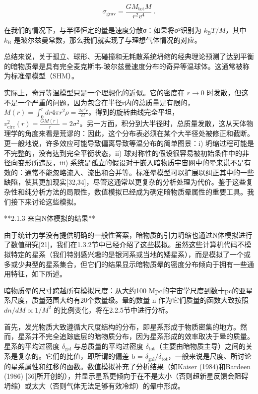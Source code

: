 \[ \sigma_{\text{grav}} = \frac{G M_{\text{tot}} M}{r^2 v^4}~. \]

在我们的情况下，与半径恒定的量是速度分散σ：如果将σ²识别为 \( k_{\text{B}} T/M \)，其中 \( k_{\text{B}} \) 是玻尔兹曼常数，那么我们就实现了与理想气体情况的对应。

总结来说，关于孤立、球形、无碰撞和无耗散系统坍缩的经典理论预测了达到平衡的暗物质晕是具有完全麦克斯韦-玻尔兹曼速度分布的奇异等温球体。这通常被称为标准晕模型（SHM）。

实际上，奇异等温模型只是一个理想化的近似。它的密度在 \( r \to 0 \) 时发散，但这不是一个严重的问题，因为包含在半径r内的总质量是有限的，\( M(r) = \int_0^r dr 4\pi r^2 \rho = \frac{2\sigma^2 r}{G} \)。得到的旋转曲线完全平坦，\( v_{\text{circ}}^2(r) = \frac{G M(r)}{r} = 2\sigma^2 \)。另一方面，积分到大半径时，总质量发散，这从天体物理学的角度来看是荒谬的：因此，这个分布表必须在某个大半径处被修正和截断。更一般地说，许多效应可能导致偏离导致等温分布的简单图景：i) 坍缩过程可能是不完整的，没有达到完全平衡状态，ii) 球对称性的假设很容易被初始条件中的非径向变形所违反，iii) 系统是孤立的假设对于嵌入暗物质宇宙网中的晕来说不是有效的：通常不能忽略流入、流出和合并等。标准晕模型可以扩展以纠正其中的一些缺陷，使其更加现实[32,34]，尽管这通常以更复杂的分析处理为代价。鉴于这些复杂性和纯分析方法的局限性，数值模拟已经成为确定暗物质晕属性的重要工具。我们接下来讨论这些模拟。

**2.1.3 来自N体模拟的结果**

由于统计力学没有提供明确的一般性答案，暗物质的引力坍缩也通过N体模拟进行了数值研究[21]，我们在1.3.2节中已经介绍了这些模拟。虽然这些计算机代码不模拟特定的星系（我们特别感兴趣的是银河系或当地的矮星系），而是模拟了一个或多或少典型的星系集合，但它们的结果显示暗物质晕的密度分布倾向于拥有一些通用特征，如下所述。

暗物质晕的尺寸跨越所有模拟尺度：从大约100 Mpc的宇宙学尺度到数十pc的亚星系尺度，质量范围大约有20个数量级。晕的数量 n 作为它们质量的函数大致按照 \( dn/dM \propto 1/M^2 \) 的比例变化，将在2.2.5节中进行分析。

首先，发光物质大致遵循大尺度结构的分布，即星系形成于物质密集的地方。然而，星系并不完全追踪底层的暗物质分布，因为星系形成的效率取决于晕的质量。星系的平均过密度 \( \delta_{\text{gal}} \) 与总质量的平均过密度 \( \delta_{\text{tot}} \)（主要由暗物质主导）之间的关系是复杂的。它们的比值，即所谓的偏差 b = \( \delta_{\text{gal}}/\delta_{\text{tot}} \)，一般来说是尺度、所讨论的星系属性和红移的函数。数值模拟补充了分析结果（如Kaiser (1984)和Bardeen (1986) [36]所开创的），并显示星系更倾向于在不是太小（否则超新星反馈会阻碍坍缩）或太大（否则气体无法足够有效冷却）的晕中形成。

